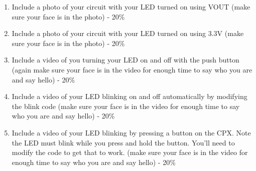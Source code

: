 

\begin{enumerate}[itemsep=-5pt]
\item Include a photo of your circuit with your LED turned on using VOUT (make sure your face is in the photo) - 20\%
\item Include a photo of your circuit with your LED turned on using 3.3V (make sure your face is in the photo) - 20\%
\item Include a video of you turning your LED on and off with the push button (again make sure your face is in the video for enough time to say who you are and say hello) - 20\%
\item Include a video of your LED blinking on and off automatically by modifying the blink code (make sure your face is in the video for enough time to say who you are and say hello) - 20\%
\item Include a video of your LED blinking by pressing a button on the CPX. Note the LED must blink while you press and hold the button. You'll need to modify the code to get that to work. (make sure your face is in the video for enough time to say who you are and say hello) - 20\%
\end{enumerate}
